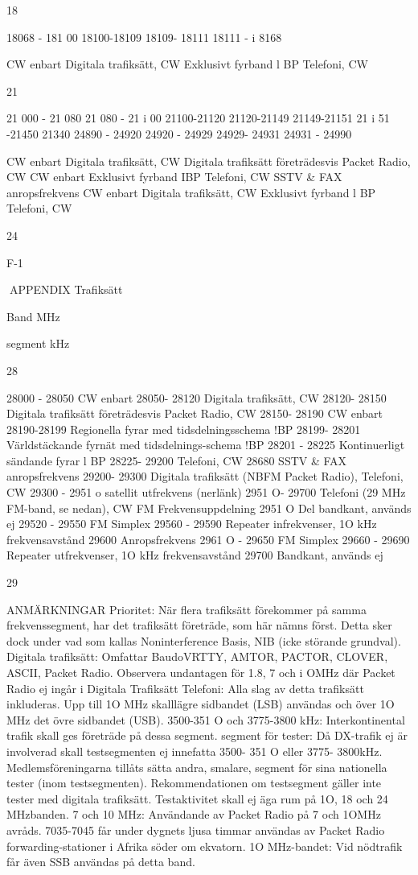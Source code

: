 18

18068 - 181 00
18100-18109
18109- 18111
18111 - i 8168

CW enbart
Digitala trafiksätt, CW
Exklusivt fyrband l BP
Telefoni, CW

21

21 000 - 21 080
21 080 - 21 i 00
21100-21120
21120-21149
21149-21151
21 i 51 -21450
21340
24890 - 24920
24920 - 24929
24929- 24931
24931 - 24990

CW enbart
Digitala trafiksätt, CW
Digitala trafiksätt företrädesvis Packet Radio, CW
CW enbart
Exklusivt fyrband IBP
Telefoni, CW
SSTV \& FAX anropsfrekvens
CW enbart
Digitala trafiksätt, CW
Exklusivt fyrband l BP
Telefoni, CW

24

F-1

APPENDIX
Trafiksätt

Band
MHz

segment
kHz

28

28000 - 28050
CW enbart
28050- 28120
Digitala trafiksätt, CW
28120- 28150
Digitala trafiksätt företrädesvis Packet Radio, CW
28150- 28190
CW enbart
28190-28199
Regionella fyrar med tidsdelningsschema !BP
28199- 28201
Världstäckande fyrnät med tidsdelnings-schema !BP
28201 - 28225
Kontinuerligt sändande fyrar l BP
28225- 29200
Telefoni, CW
28680
SSTV \& FAX anropsfrekvens
29200- 29300
Digitala trafiksätt (NBFM Packet Radio), Telefoni, CW
29300 - 2951 o
satellit utfrekvens (nerlänk)
2951 O- 29700
Telefoni (29 MHz FM-band, se nedan), CW
FM Frekvensuppdelning
2951 O
Del bandkant, används ej
29520 - 29550
FM Simplex
29560 - 29590
Repeater infrekvenser, 1O kHz frekvensavstånd
29600
Anropsfrekvens
2961 O - 29650
FM Simplex
29660 - 29690
Repeater utfrekvenser, 1O kHz frekvensavstånd
29700
Bandkant, används ej

29

ANMÄRKNINGAR
Prioritet:
När flera trafiksätt förekommer på samma frekvenssegment, har det trafiksätt företräde, som här nämns
först. Detta sker dock under vad som kallas Noninterference Basis, NIB (icke störande grundval).
Digitala trafiksätt:
Omfattar BaudoVRTTY, AMTOR, PACTOR, CLOVER,
ASCII, Packet Radio.
Observera undantagen för 1.8, 7 och i OMHz där Packet
Radio ej ingår i Digitala Trafiksätt
Telefoni:
Alla slag av detta trafiksätt inkluderas. Upp till 1O MHz
skalllägre sidbandet (LSB) användas och över 1O MHz
det övre sidbandet (USB).
3500-351 O och 3775-3800 kHz:
Interkontinental trafik skall ges företräde på dessa segment.
segment för tester:
Då DX-trafik ej är involverad skall testsegmenten ej
innefatta 3500- 351 O eller 3775- 3800kHz. Medlemsföreningarna tillåts sätta andra, smalare, segment för
sina nationella tester (inom testsegmenten).
Rekommendationen om testsegment gäller inte tester
med digitala trafiksätt.
Testaktivitet skall ej äga rum på 1O, 18 och 24 MHzbanden.
7 och 10 MHz:
Användande av Packet Radio på 7 och 1OMHz avråds.
7035-7045 får under dygnets ljusa timmar användas av
Packet Radio forwarding-stationer i Afrika söder om
ekvatorn.
1O MHz-bandet:
Vid nödtrafik får även SSB användas på detta band.

